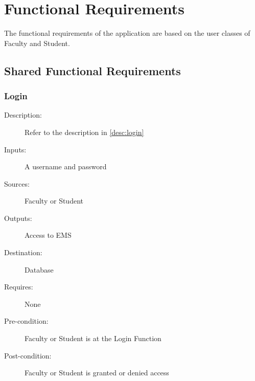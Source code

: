 %
%



\section{Functional Requirements}
The functional requirements of the application are based on the user classes of
Faculty and Student.
\subsection{Shared Functional Requirements}

\subsubsection{\large Login} 
\begin{boxed} %
\begin{description}
\item[Description:]
   Refer to the description in \autoref{desc:login}
\item[Inputs:]
   A username and password
\item[Sources:]
   Faculty or Student
\item[Outputs:]
   Access to EMS
\item[Destination:]
   Database
\item[Requires:]
   None
\item[Pre-condition:]
   Faculty or Student is at the Login Function
\item[Post-condition:]
   Faculty or Student is granted or denied access
\end{description}
\end{boxed} %


